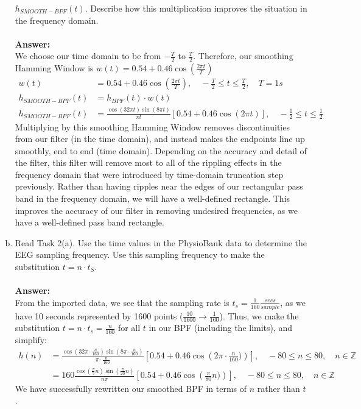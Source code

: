 \documentclass[12pt, a4paper]{article}
\def\Z{\mathbb Z}
\begin{document}
\begin{enumerate}[(a)]
$h_{SMOOTH-BPF}(t)$. Describe how this multiplication improves the situation in the
frequency domain. \\ \\
\textbf{Answer: } \\
We choose our time domain to be from $-\frac{T}{2}$ to $\frac{T}{2}$. Therefore, our smoothing Hamming Window is $w(t) = 0.54 + 0.46\cos(\frac{2\pi t}{T})$
\begin{align*}
w(t) &= 0.54 + 0.46 \cos \left(\frac{2 \pi t}{T}\right), \quad -\frac{T}{2} \leq t \leq \frac{T}{2}, \quad T = 1s \\
h_{SMOOTH-BPF}(t) &= h_{BPF}(t)\cdot w(t)\\
h_{SMOOTH-BPF}(t) &= \frac{\cos(32\pi t)\sin(8\pi t)}{\pi t}\left[0.54 + 0.46 \cos \left(2\pi t\right)\right], \quad -\frac{1}{2} \leq t \leq \frac{1}{2}
\end{align*}
Multiplying by this smoothing Hamming Window removes discontinuities from our filter (in the time domain), and instead makes the endpoints line up smoothly, end to end (time domain). Depending on the accuracy and detail of the filter, this filter will remove most to all of the rippling effects in the frequency domain that were introduced by time-domain truncation step previously. Rather than having ripples near the edges of our rectangular pass band in the frequency domain, we will have a well-defined rectangle. This improves the accuracy of our filter in removing undesired frequencies, as we have a well-defined pass band rectangle.
\item
Read Task 2(a). Use the time values in the PhysioBank data to determine the EEG
sampling frequency. Use this sampling frequency to make the substitution $t = n\cdot t_S$. \\ \\
\textbf{Answer: } \\ From the imported data, we see that the sampling rate is $t_s = \frac{1}{160} \frac{secs}{sample}$, as we have 10 seconds represented by 1600 points ($\frac{10}{1600} \to \frac{1}{160}$). Thus, we make the substitution $t = n\cdot t_s = \frac{n}{160}$ for all $t$ in our BPF (including the limits), and simplify:
\begin{align*}
h(n) &=  \frac{\cos(32 \pi \cdot \frac{n}{160})\sin(8 \pi\cdot \frac{n}{160})}{\pi \cdot \frac{n}{160}}\left[0.54 + 0.46 \cos \left(2\pi \cdot \frac{n}{160})\right)\right], \quad -80\leq n \leq  80, \quad n \in \Z \\
 &=  160\frac{\cos(\frac{\pi}{5} n)\sin(\frac{\pi}{20} n)}{n\pi}\left[0.54 + 0.46 \cos \left(\frac{\pi}{80} n)\right)\right], \quad -80\leq n \leq  80, \quad n \in \Z
\end{align*}
We have successfully rewritten our smoothed BPF in terms of $n$ rather than $t$.
\end{enumerate}
\pagebreak
\end{document}
